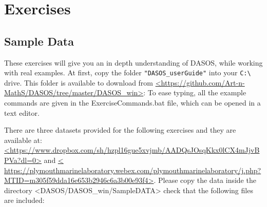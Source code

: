 \documentclass{subfiles}
\begin{document}
		
	\section{Exercises}\label{exercises}
	
	   	\subsection{Sample Data}
	   	These exercises will give you an in depth understanding of DASOS, while working with real examples. At first, copy the folder \verb|"DASOS_userGuide"| into your \verb|C:\| drive. This folder is available to download from \url{<https://github.com/Art-n-MathS/DASOS/tree/master/DASOS_win>}: To ease typing, all the example commands are given in the ExerciseCommands.bat file, which can be opened in a text editor.
	   	
	   	There are three datasets provided for the following exercises and they are available at: \url{<https://www.dropbox.com/sh/hzpl16gue5xvjmb/AADQsJOsqKkx0lCX4mJjvBPVa?dl=0>} and \url{<  		https://plymouthmarinelaboratory.webex.com/plymouthmarinelaboratory/j.php?MTID=m305f59dda16e653b2946c6a3b00e93f4>}. Please copy the data inside the directory <DASOS/DASOS\_win/SampleDATA> check that the following files are included:
	   	
\end{document}
